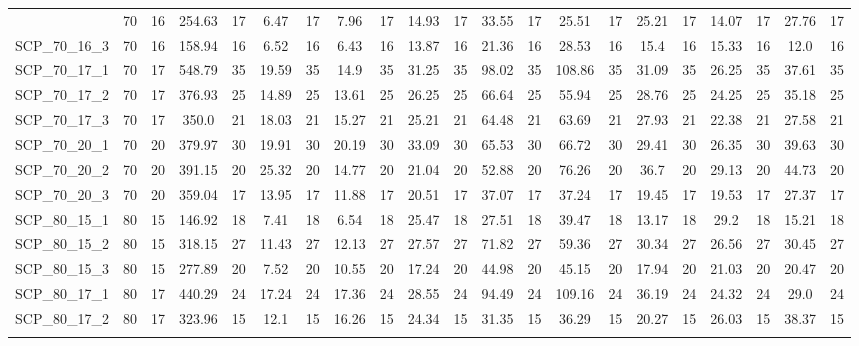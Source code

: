 \begin{sidewaystable}[!ht]
{\begin{tabular}{lcccccccccccccccccccc}
{SCP\_70\_16\_2 & 70 & 16 & 254.63 & 17 &  \textcolor{blue2}{6.47} & 17 & 7.96 & 17 & 14.93 & 17 & 33.55 & 17 & 25.51 & 17 & 25.21 & 17 & 14.07 & 17 & 27.76 & 17 \\
SCP\_70\_16\_3 & 70 & 16 & 158.94 & 16 & 6.52 & 16 &  \textcolor{blue2}{6.43} & 16 & 13.87 & 16 & 21.36 & 16 & 28.53 & 16 & 15.4 & 16 & 15.33 & 16 & 12.0 & 16 \\
SCP\_70\_17\_1 & 70 & 17 & 548.79 & 35 & 19.59 & 35 &  \textcolor{blue2}{14.9} & 35 & 31.25 & 35 & 98.02 & 35 & 108.86 & 35 & 31.09 & 35 & 26.25 & 35 & 37.61 & 35 \\
SCP\_70\_17\_2 & 70 & 17 & 376.93 & 25 & 14.89 & 25 &  \textcolor{blue2}{13.61} & 25 & 26.25 & 25 & 66.64 & 25 & 55.94 & 25 & 28.76 & 25 & 24.25 & 25 & 35.18 & 25 \\
SCP\_70\_17\_3 & 70 & 17 & 350.0 & 21 & 18.03 & 21 &  \textcolor{blue2}{15.27} & 21 & 25.21 & 21 & 64.48 & 21 & 63.69 & 21 & 27.93 & 21 & 22.38 & 21 & 27.58 & 21 \\
SCP\_70\_20\_1 & 70 & 20 & 379.97 & 30 &  \textcolor{blue2}{19.91} & 30 & 20.19 & 30 & 33.09 & 30 & 65.53 & 30 & 66.72 & 30 & 29.41 & 30 & 26.35 & 30 & 39.63 & 30 \\
SCP\_70\_20\_2 & 70 & 20 & 391.15 & 20 & 25.32 & 20 &  \textcolor{blue2}{14.77} & 20 & 21.04 & 20 & 52.88 & 20 & 76.26 & 20 & 36.7 & 20 & 29.13 & 20 & 44.73 & 20 \\
SCP\_70\_20\_3 & 70 & 20 & 359.04 & 17 & 13.95 & 17 &  \textcolor{blue2}{11.88} & 17 & 20.51 & 17 & 37.07 & 17 & 37.24 & 17 & 19.45 & 17 & 19.53 & 17 & 27.37 & 17 \\
SCP\_80\_15\_1 & 80 & 15 & 146.92 & 18 & 7.41 & 18 &  \textcolor{blue2}{6.54} & 18 & 25.47 & 18 & 27.51 & 18 & 39.47 & 18 & 13.17 & 18 & 29.2 & 18 & 15.21 & 18 \\
SCP\_80\_15\_2 & 80 & 15 & 318.15 & 27 &  \textcolor{blue2}{11.43} & 27 & 12.13 & 27 & 27.57 & 27 & 71.82 & 27 & 59.36 & 27 & 30.34 & 27 & 26.56 & 27 & 30.45 & 27 \\
SCP\_80\_15\_3 & 80 & 15 & 277.89 & 20 &  \textcolor{blue2}{7.52} & 20 & 10.55 & 20 & 17.24 & 20 & 44.98 & 20 & 45.15 & 20 & 17.94 & 20 & 21.03 & 20 & 20.47 & 20 \\
SCP\_80\_17\_1 & 80 & 17 & 440.29 & 24 &  \textcolor{blue2}{17.24} & 24 & 17.36 & 24 & 28.55 & 24 & 94.49 & 24 & 109.16 & 24 & 36.19 & 24 & 24.32 & 24 & 29.0 & 24 \\
SCP\_80\_17\_2 & 80 & 17 & 323.96 & 15 &  \textcolor{blue2}{12.1} & 15 & 16.26 & 15 & 24.34 & 15 & 31.35 & 15 & 36.29 & 15 & 20.27 & 15 & 26.03 & 15 & 38.37 & 15 \\
}
\end{tabular}}
\end{sidewaystable}
